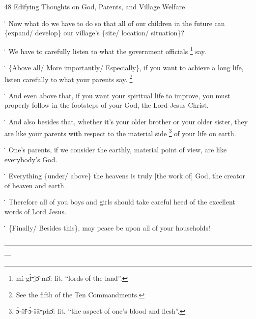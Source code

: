 
48 Edifying Thoughts on God, Parents, and Village Welfare

\. Now what do we have to do so that all of our children in the future can \{expand/
develop\} our village's \{site/ location/ situation\}?

\. We have to carefully listen to what the government officials \footnote{mì-gɨ̀꞊jɔ̂-mɔ̂: lit. ``lords of the land''.} say.

\. \{Above all/ More importantly/ Especially\}, if you want to achieve a long life,
listen carefully to what your parents say. \footnote{See the fifth of the Ten Commandments.}

\. And even above that, if you want your spiritual life to improve, you must properly
follow in the footsteps of your God, the Lord Jesus Christ.

\. And also besides that, whether it's your older brother or your older sister,
they are like your parents with respect to the material side \footnote{ɔ̀-šɨ̄-ɔ̀-šā꞊phɔ̂: lit. ``the aspect of one's blood and flesh''.} of your life on
earth.

\. One's parents, if we consider the earthly, material point of view, are like
everybody's God.

\. Everything \{under/ above\} the heavens is truly [the work of] God, the creator
of heaven and earth.

\. Therefore all of you boys and girls should take careful heed of the excellent
words of Lord Jesus.

\. \{Finally/ Besides this\}, may peace be upon all of your households!

---------------------------------------------------------------------------------------------------------------

